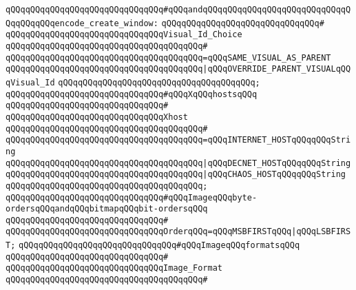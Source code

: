 \verb|qQQqqQQqqQQqqQQqqQQqqQQqqQQqqQQq#qQQqandqQQqqQQqqQQqqQQqqQQqqQQqqQQqqQQqqQQqqQQqencode_create_window:|\newline
\verb|qQQqqQQqqQQqqQQqqQQqqQQqqQQqqQQq#|\newline
\verb|qQQqqQQqqQQqqQQqqQQqqQQqqQQqqQQqVisual_Id_Choice|\newline
\verb|qQQqqQQqqQQqqQQqqQQqqQQqqQQqqQQqqQQqqQQq#|\newline
\verb|qQQqqQQqqQQqqQQqqQQqqQQqqQQqqQQqqQQqqQQq=qQQqSAME_VISUAL_AS_PARENT|\newline
\verb|qQQqqQQqqQQqqQQqqQQqqQQqqQQqqQQqqQQqqQQq|\verb#|qQQqOVERRIDE_PARENT_VISUALqQQqVisual_Id#\newline
\verb|qQQqqQQqqQQqqQQqqQQqqQQqqQQqqQQqqQQqqQQq;|\newline
\newline
\verb|qQQqqQQqqQQqqQQqqQQqqQQqqQQqqQQq#qQQqXqQQqhostsqQQq|\newline
\verb|qQQqqQQqqQQqqQQqqQQqqQQqqQQqqQQq#|\newline
\verb|qQQqqQQqqQQqqQQqqQQqqQQqqQQqqQQqXhost|\newline
\verb|qQQqqQQqqQQqqQQqqQQqqQQqqQQqqQQqqQQqqQQq#|\newline
\verb|qQQqqQQqqQQqqQQqqQQqqQQqqQQqqQQqqQQqqQQq=qQQqINTERNET_HOSTqQQqqQQqString|\newline
\verb|qQQqqQQqqQQqqQQqqQQqqQQqqQQqqQQqqQQqqQQq|\verb#|qQQqDECNET_HOSTqQQqqQQqString#\newline
\verb|qQQqqQQqqQQqqQQqqQQqqQQqqQQqqQQqqQQqqQQq|\verb#|qQQqCHAOS_HOSTqQQqqQQqString#\newline
\verb|qQQqqQQqqQQqqQQqqQQqqQQqqQQqqQQqqQQqqQQq;|\newline
\newline
\verb|qQQqqQQqqQQqqQQqqQQqqQQqqQQqqQQq#qQQqImageqQQqbyte-ordersqQQqandqQQqbitmapqQQqbit-ordersqQQq|\newline
\verb|qQQqqQQqqQQqqQQqqQQqqQQqqQQqqQQq#|\newline
\verb|qQQqqQQqqQQqqQQqqQQqqQQqqQQqqQQqOrderqQQq=qQQqMSBFIRSTqQQq|\verb#|qQQqLSBFIRST;#\newline
\newline
\verb|qQQqqQQqqQQqqQQqqQQqqQQqqQQqqQQq#qQQqImageqQQqformatsqQQq|\newline
\verb|qQQqqQQqqQQqqQQqqQQqqQQqqQQqqQQq#|\newline
\verb|qQQqqQQqqQQqqQQqqQQqqQQqqQQqqQQqImage_Format|\newline
\verb|qQQqqQQqqQQqqQQqqQQqqQQqqQQqqQQqqQQqqQQq#|\newline
